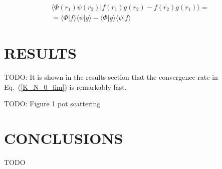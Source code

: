 \documentclass[aip
, pra
, showpacs
, aps
, twocolumn
, groupedaddress
, floatfix
]{revtex4}
\newcommand{\beq}{\begin{equation}}
\newcommand{\eeq}{\end{equation}}
\newcommand{\barr}{\begin{array}}
\newcommand{\earr}{\end{array}}
\begin{document}
\beq \barr{l}
\langle  \Phi(r_1) \psi(r_2) |f(r_1) g(r_2) - f(r_2) g(r_1) \rangle = \\
=\langle  \Phi |f \rangle  \langle  \psi |g \rangle -
\langle  \Phi |g \rangle  \langle  \psi |f \rangle
\earr \eeq


\section{RESULTS}
TODO: It is shown in the results section that the convergence rate in Eq.~(\ref{K_N_0_lim}) is remarkably fast.

TODO: Figure 1 pot scattering

\section{CONCLUSIONS}
TODO


\begin{acknowledgments}
\end{acknowledgments}





%
\end{document}

